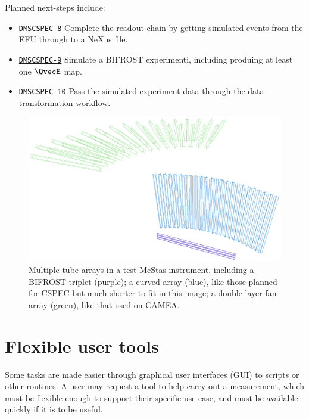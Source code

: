 \documentclass[a4paper, twocolumn, 10pt, revision]{ess}
\begin{document}
Planned next-steps include:
\begin{itemize}
	\item \href{https://jira.esss.lu.se/projects/DMSCSPEC/issues/DMSCSPEC-8}{\texttt{DMSCSPEC-8}}
		Complete the readout chain by getting simulated events from the EFU through to a NeXus file.
	\item \href{https://jira.esss.lu.se/projects/DMSCSPEC/issues/DMSCSPEC-9}{\texttt{DMSCSPEC-9}}
		Simulate a BIFROST experimenti, including produing at least one $\QvecE$ map.
	\item \href{https://jira.esss.lu.se/projects/DMSCSPEC/issues/DMSCSPEC-10}{\texttt{DMSCSPEC-10}}
		Pass the simulated experiment data through the data transformation workflow.
\end{itemize}

\begin{figure}
\begin{centering}
	\includegraphics[width=\columnwidth]{detector_tubes}
\end{centering}
\caption{%
Multiple tube arrays in a test McStas instrument, including a BIFROST triplet (purple);
	a curved array (blue), like those planned for CSPEC but much shorter to fit in this image;
	a double-layer fan array (green), like that used on CAMEA.
\label{fig:detector_tubes}}
\end{figure}


\section{Flexible user tools}
Some tasks are made easier through graphical user interfaces (GUI) to scripts or other routines.
A user may request a tool to help carry out a measurement, which must be flexible enough to support their specific use case,
and must be available quickly if it is to be useful.
\end{document}
